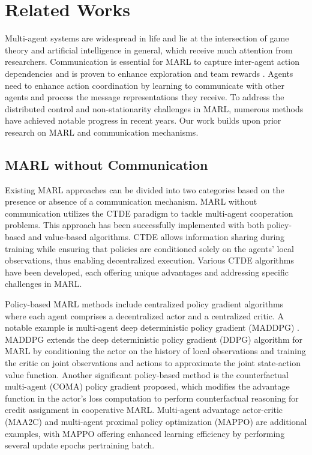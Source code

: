 \section{Related Works}
\label{S_2}

Multi-agent systems are widespread in life and lie at the intersection of game theory and artificial intelligence in general, which receive much attention from researchers. Communication is essential for MARL to capture inter-agent action dependencies and is proven to enhance exploration and team rewards \cite{apicella2012social, li2021structured, zhang2020succinct}. Agents need to enhance action coordination by learning to communicate with other agents and process the message representations they receive. To address the distributed control and non-stationarity challenges in MARL, numerous methods have achieved notable progress in recent years. Our work builds upon prior research on MARL and communication mechanisms. 


\subsection{MARL without Communication}

Existing MARL approaches can be divided into two categories based on the presence or absence of a communication mechanism. MARL without communication utilizes the CTDE paradigm to tackle multi-agent cooperation problems. This approach has been successfully implemented with both policy-based and value-based algorithms. CTDE allows information sharing during training while ensuring that policies are conditioned solely on the agents' local observations, thus enabling decentralized execution. Various CTDE algorithms have been developed, each offering unique advantages and addressing specific challenges in MARL.

Policy-based MARL methods include centralized policy gradient algorithms where each agent comprises a decentralized actor and a centralized critic. A notable example is multi-agent deep deterministic policy gradient (MADDPG) \cite{lowe2017multi}. MADDPG extends the deep deterministic policy gradient (DDPG) \cite{silver2014deterministic} algorithm for MARL by conditioning the actor on the history of local observations and training the critic on joint observations and actions to approximate the joint state-action value function. Another significant policy-based method is the counterfactual multi-agent (COMA) \cite{foerster2018counterfactual} policy gradient proposed, which modifies the advantage function in the actor’s loss computation to perform counterfactual reasoning for credit assignment in cooperative MARL. Multi-agent advantage actor-critic (MAA2C) and multi-agent proximal policy optimization (MAPPO) \cite{yu2022surprising} are additional examples, with MAPPO offering enhanced learning efficiency by performing several update epochs pertraining batch.

